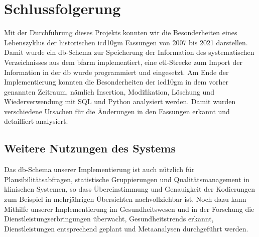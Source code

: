 \chapter{Schlussfolgerung} \label{ch:conclusion}

Mit der Durchführung dieses Projekts konnten wir die Besonderheiten eines Lebenszyklus der historischen \ac{icd10gm} Fassungen von 2007 bis 2021 darstellen. Damit wurde ein \ac{db}-Schema zur Speicherung der Information des systematischen Verzeichnisses aus dem \ac{bfarm} implementiert, eine \ac{etl}-Strecke zum Import der Information in der \ac{db} wurde programmiert und eingesetzt. Am Ende der Implementierung konnten die Besonderheiten der \ac{icd10gm} in dem vorher genannten Zeitraum, nämlich Insertion, Modifikation, Löschung und Wiederverwendung mit SQL und Python analysiert werden. Damit wurden verschiedene Ursachen für die Änderungen in den Fassungen erkannt und detailliert analysiert.

\section{Weitere Nutzungen des Systems} \label{sec:future}

Das \ac{db}-Schema unserer Implementierung ist auch nützlich für Plausibilitätsabfragen, statistische Gruppierungen und Qualitätsmanagement in klinischen Systemen, so dass Übereinstimmung und Genauigkeit der Kodierungen zum Beispiel in mehrjährigen Übersichten nachvollziehbar ist. Noch dazu kann Mithilfe unserer Implementierung im Gesundheitswesen und in der Forschung die Dienstleistungserbringungen überwacht, Gesundheitstrends erkannt, Dienstleistungen entsprechend geplant und Metaanalysen durchgeführt werden.